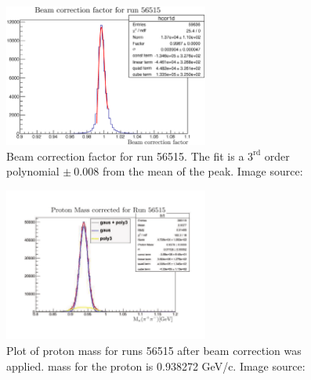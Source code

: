 \begin{figure}\begin{center}
\includegraphics[width=0.6\textwidth]{figures/calib/tag/ecor/56515_cor.eps}
\caption[Beam Correction Factor for Run 56515]{\label{fig:56515.cor} Beam correction factor for run 56515. The fit is a $3^\mathrm{rd}$ order polynomial $\pm~0.008$ from the mean of the peak. Image source:~\cite{clas.thesis.kunkel}}
\end{center}\end{figure}

\begin{figure}\begin{center}
\includegraphics[width=0.6\textwidth]{figures/calib/tag/ecor/FixedmisssingmassII.pdf}
\caption[Proton Mass for Run 56515 After Beam Correction]{\label{fig:proton.fix} Plot of proton mass for runs 56515 after beam correction was applied.   mass for the proton is 0.938272 GeV/c. Image source:~\cite{clas.thesis.kunkel}}
\end{center}\end{figure}

